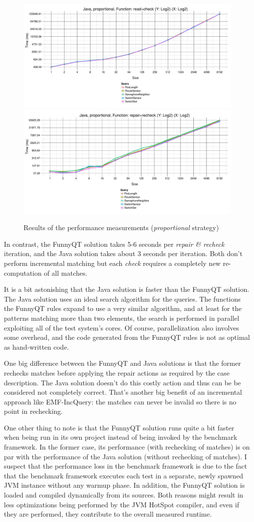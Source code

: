 \documentclass[submission]{eptcs}
\begin{document}
\begin{figure}[h!tb]
  \includegraphics[width=.495\textwidth]{perf/proportional-Java-GroupBy-Query-time-batch-validation}
  \includegraphics[width=.495\textwidth]{perf/proportional-Java-GroupBy-Query-time-revalidation}

  \caption{Results of the performance measurements (\emph{proportional} strategy)}
  \label{fig:performance-prop}
\end{figure}

In contrast, the FunnyQT solution takes 5-6 seconds per \emph{repair \&
  recheck} iteration, and the Java solution takes about 3 seconds per
iteration.  Both don't perform incremental matching but each \emph{check}
requires a completely new re-computation of all matches.

It is a bit astonishing that the Java solution is faster than the FunnyQT
solution.  The Java solution uses an ideal search algorithm for the queries.
The functions the FunnyQT rules expand to use a very similar algorithm, and at
least for the patterns matching more than two elements, the search is performed
in parallel exploiting all of the test system's cores.  Of course,
parallelization also involves some overhead, and the code generated from the
FunnyQT rules is not as optimal as hand-written code.

One big difference between the FunnyQT and Java solutions is that the former
rechecks matches before applying the repair actions as required by the case
description.  The Java solution doesn't do this costly action and thus can be
be considered not completely correct.  That's another big benefit of an
incremental approach like EMF-IncQuery: the matches can never be invalid so
there is no point in rechecking.

One other thing to note is that the FunnyQT solution runs quite a bit faster
when being run in its own project instead of being invoked by the benchmark
framework.  In the former case, its performance (with rechecking of matches) is
on par with the performance of the Java solution (without rechecking of
matches).  I suspect that the performance loss in the benchmark framework is
due to the fact that the benchmark framework executes each test in a separate,
newly spawned JVM instance without any warmup phase.  In addition, the FunnyQT
solution is loaded and compiled dynamically from its sources.  Both reasons
might result in less optimizations being performed by the JVM HotSpot compiler,
and even if they are performed, they contribute to the overall measured
runtime.
\end{document}
